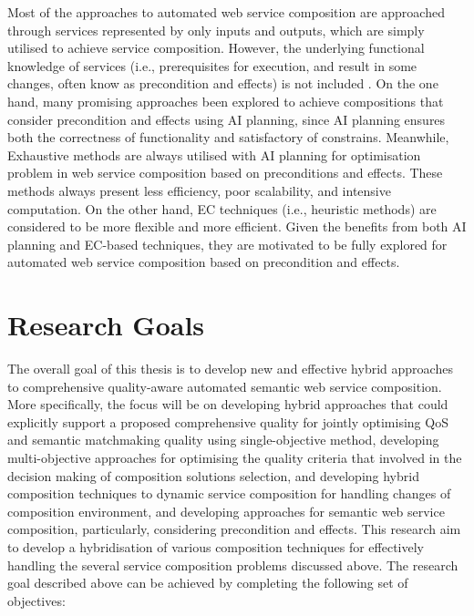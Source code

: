 Most of the approaches to automated web service composition are approached through services represented by only inputs and outputs, which are simply utilised to achieve service composition. However, the underlying functional knowledge of services (i.e., prerequisites for execution, and result in some changes, often know as precondition and effects) is not included \cite{paliwal2012semantics}. On the one hand, many promising approaches \cite{DBLP:journals/soca/BoustilMS14} been explored to achieve compositions that consider precondition and effects using AI planning, since AI planning ensures both the correctness of functionality and satisfactory of constrains. Meanwhile, Exhaustive methods are always utilised with AI planning for optimisation problem in web service composition based on preconditions and effects. These methods always present less efficiency, poor scalability, and intensive computation. On the other hand, EC techniques (i.e., heuristic methods) are considered to be more flexible and more efficient. Given the benefits from both AI planning and EC-based techniques, they are motivated to be fully explored for automated web service composition based on precondition and effects.
 
\section{Research Goals}
The overall goal of this thesis is to develop new and effective hybrid approaches to comprehensive quality-aware automated semantic web service composition. More specifically, the focus will be on developing hybrid approaches that could explicitly support a proposed comprehensive quality for jointly optimising QoS and semantic matchmaking quality using single-objective method, developing multi-objective approaches for optimising the quality criteria that involved in the decision making of composition solutions selection, and developing hybrid composition techniques to dynamic service composition for handling changes of composition environment, and developing approaches for semantic web service composition, particularly, considering precondition and effects. This research aim to develop a hybridisation of various composition techniques for effectively handling the several service composition problems discussed above. The research goal described above can be achieved by completing the following set of objectives:


